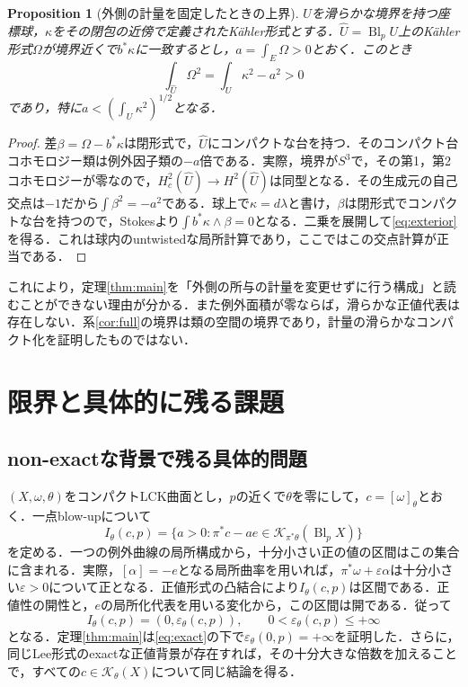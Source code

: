 \documentclass[12pt]{amsart}
\newtheorem{prop}[thm]{Proposition}
\theoremstyle{definition}
\theoremstyle{remark}
\numberwithin{equation}{section}
\newcommand{\cK}{\mathcal{K}}
\begin{document}
\begin{prop}[外側の計量を固定したときの上界]\label{prop:exterior}
$U$を滑らかな境界を持つ座標球，$\kappa$をその閉包の近傍で定義されたK\"ahler形式とする．$\widehat U=\operatorname{Bl}_pU$上のK\"ahler形式$\Omega$が境界近くで$b^*\kappa$に一致するとし，$a=\int_E\Omega>0$とおく．このとき
\begin{equation}\label{eq:exterior}
 \int_{\widehat U}\Omega^2=\int_U\kappa^2-a^2>0
\end{equation}
であり，特に$a<(\int_U\kappa^2)^{1/2}$となる．
\end{prop}
\begin{proof}
差$\beta=\Omega-b^*\kappa$は閉形式で，$\widehat U$にコンパクトな台を持つ．そのコンパクト台コホモロジー類は例外因子類の$-a$倍である．実際，境界が$S^3$で，その第1，第2コホモロジーが零なので，$H_c^2(\widehat U)\to H^2(\widehat U)$は同型となる．その生成元の自己交点は$-1$だから$\int\beta^2=-a^2$である．球上で$\kappa=d\lambda$と書け，$\beta$は閉形式でコンパクトな台を持つので，Stokesより$\int b^*\kappa\wedge\beta=0$となる．二乗を展開して\eqref{eq:exterior}を得る．これは球内のuntwistedな局所計算であり，ここではこの交点計算が正当である．
\end{proof}
これにより，定理\ref{thm:main}を「外側の所与の計量を変更せずに行う構成」と読むことができない理由が分かる．また例外面積が零ならば，滑らかな正値代表は存在しない．系\ref{cor:full}の境界は類の空間の境界であり，計量の滑らかなコンパクト化を証明したものではない．

\section{限界と具体的に残る課題}\label{sec:limits}
\subsection{non-exactな背景で残る具体的問題}
$(X,\omega,\theta)$をコンパクトLCK曲面とし，$p$の近くで$\theta$を零にして，$c=[\omega]_\theta$とおく．一点blow-upについて
\begin{equation}\label{eq:epsilon}
 I_\theta(c,p)=\{a>0:\pi^*c-ae\in\cK_{\pi^*\theta}(\operatorname{Bl}_pX)\}
\end{equation}
を定める．一つの例外曲線の局所構成から，十分小さい正の値の区間はこの集合に含まれる．実際，$[\alpha]=-e$となる局所曲率を用いれば，$\pi^*\omega+\varepsilon\alpha$は十分小さい$\varepsilon>0$について正となる．正値形式の凸結合により$I_\theta(c,p)$は区間である．正値性の開性と，$e$の局所化代表を用いる変化から，この区間は開である．従って
\[
 I_\theta(c,p)=(0,\varepsilon_\theta(c,p)),\qquad
 0<\varepsilon_\theta(c,p)\leq+\infty
\]
となる．定理\ref{thm:main}は\eqref{eq:exact}の下で$\varepsilon_\theta(0,p)=+\infty$を証明した．さらに，同じLee形式のexactな正値背景が存在すれば，その十分大きな倍数を加えることで，すべての$c\in\cK_\theta(X)$について同じ結論を得る．
\end{document}
